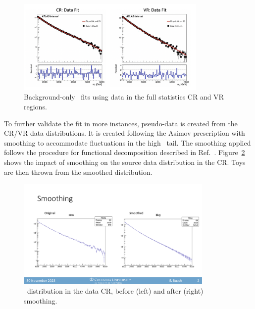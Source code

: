 \begin{figure}[!htbp]
\centering
   \includegraphics[width=0.82\textwidth]{figures/stats/bkgfit_data_fullstats}
    \caption{Background-only \mt~fits using data in the full statistics CR and VR regions.
    \label{fig:bkgfit_data_fullstats}}
\end{figure}

To further validate the fit in more instances, pseudo-data is created from the CR/VR data distributions. 
It is created following the Asimov prescription with smoothing to accommodate fluctuations in the high \mt~tail. 
The smoothing applied follows the procedure for functional decomposition described in Ref.~\cite{edgar2018functional}.
Figure~\ref{fig:smoothing} shows the impact of smoothing on the source data distribution in the CR.
Toys are then thrown from the smoothed distribution.
\begin{figure}[!htbp]
\centering
   \includegraphics[width=0.85\textwidth]{figures/stats/smoothing}
    \caption{\mt~distribution in the data CR, before (left) and after (right) smoothing.
    \label{fig:smoothing}}
\end{figure}

